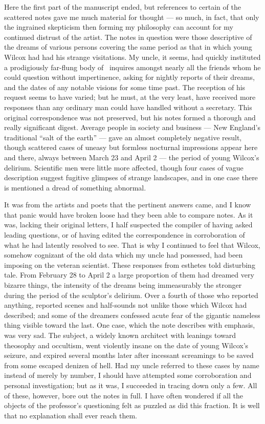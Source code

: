 Here the first part of the manuscript ended, but references to certain
of the scattered notes gave me much material for thought --- so much, in
fact, that only the ingrained skepticism then forming my philosophy can
account for my continued distrust of the artist. The notes in question
were those descriptive of the dreams of various persons covering the
same period as that in which young Wilcox had had his strange
visitations. My uncle, it seems, had quickly instituted a prodigiously
far-flung body of \est\ inquires amongst nearly all the friends whom he could
question without impertinence, asking for nightly reports of their
dreams, and the dates of any notable visions for some time past. The
reception of his request seems to have varied; but he must, at the very
least, have received more responses than any ordinary man could have
handled without a secretary. This original correspondence was not
preserved, but his notes formed a thorough and really significant
digest. Average people in society and business --- New England's
traditional ``salt of the earth'' --- gave an almost completely negative
result, though scattered cases of uneasy but formless nocturnal
impressions appear here and there, always between March 23 and April 2 ---
the period of young Wilcox's delirium. Scientific men were little more
affected, though four cases of vague description suggest fugitive
glimpses of strange landscapes, and in one case there is mentioned a
dread of something abnormal.

It was from the artists and poets that the pertinent answers came, and I
know that panic would have broken loose had they been able to compare
notes. As it was, lacking their original letters, I half suspected the
compiler of having asked leading questions, or of having edited the
correspondence in corroboration of what he had latently resolved to see.
That is why I continued to feel that Wilcox, somehow cognizant of the
old data which my uncle had possessed, had been imposing on the veteran
scientist. These responses from esthetes told disturbing tale. From
February 28 to April 2 a large proportion of them had dreamed very
bizarre things, the intensity of the dreams being immeasurably the
stronger during the period of the sculptor's delirium. Over a fourth of
those who reported anything, reported scenes and half-sounds not unlike
those which Wilcox had described; and some of the dreamers confessed
acute fear of the gigantic nameless thing visible toward the last. One
case, which the note describes with emphasis, was very sad. The subject,
a widely known architect with leanings toward theosophy and occultism,
went violently insane on the date of young Wilcox's seizure, and expired
several months later after incessant screamings to be saved from some
escaped denizen of hell. Had my uncle referred to these cases by name
instead of merely by number, I should have attempted some corroboration
and personal investigation; but as it was, I succeeded in tracing down
only a few. All of these, however, bore out the notes in full. I have
often wondered if all the objects of the professor's questioning felt as
puzzled as did this fraction. It is well that no explanation shall ever
reach them.

